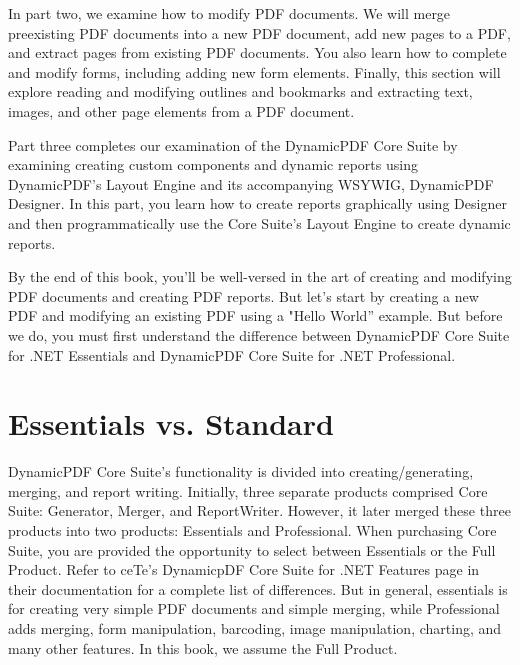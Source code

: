 \documentclass[american]{tufte-book}
\numberwithin{equation}{section}
\numberwithin{figure}{section}
\begin{document}
In part two, we examine how to modify PDF documents. We will merge preexisting PDF documents into a new PDF document, add new pages to a PDF, and extract pages from existing PDF documents. You also learn how to complete and modify forms, including adding new form elements. Finally, this section will explore reading and modifying outlines and bookmarks and extracting text, images, and other page elements from a PDF document.

Part three completes our examination of the DynamicPDF Core Suite by examining creating custom components and dynamic reports using DynamicPDF's Layout Engine and its accompanying WSYWIG, DynamicPDF Designer. In this part, you learn how to create reports graphically using Designer and then programmatically use the Core Suite's Layout Engine to create dynamic reports. 

By the end of this book, you'll be well-versed
in the art of creating and modifying PDF documents and creating PDF reports.  But let's start by creating a new PDF and modifying an existing PDF using
a "Hello World'' example. But before we do, you must first understand
the difference between DynamicPDF Core Suite for .NET Essentials
and DynamicPDF Core Suite for .NET Professional.

\section{Essentials vs. Standard}

DynamicPDF Core Suite’s functionality is divided into creating/generating,
merging, and report writing. Initially, three separate products comprised
Core Suite: Generator, Merger, and ReportWriter. However, it later
merged these three products into two products: Essentials and Professional.
When purchasing Core Suite, you are provided the opportunity to select
between Essentials or the Full Product. Refer to ceTe’s DynamicpDF
Core Suite for .NET Features page in their documentation for a complete
list of differences. But in general, essentials is for creating very simple PDF documents
and simple merging, while Professional adds merging, form manipulation,
barcoding, image manipulation, charting, and many other features.
In this book, we assume the Full Product.
\end{document}
